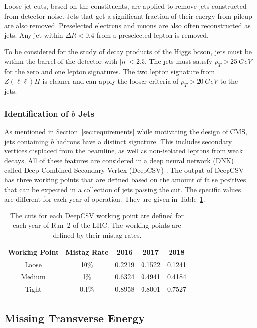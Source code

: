 Loose jet cuts, based on the constituents,
are applied to remove jets constructed from detector noise.
Jets that get a significant fraction of their energy from pileup are also removed.
Preselected electrons and muons are also often reconstructed as jets.
Any jet within $\Delta R < 0.4$ from a preselected lepton is removed.

To be considered for the study of decay products of the Higgs boson,
jets must be within the barrel of the detector with $|\eta| < 2.5$.
The jets must satisfy $p_T > \SI{25}{GeV}$ for the zero and one lepton signatures.
The two lepton signature from $Z(\ell\ell)H$ is cleaner and can apply the looser
criteria of $p_T > \SI{20}{GeV}$ to the jets.

\subsubsection{Identification of $b$ Jets}

As mentioned in Section~\ref{sec:requirements} while motivating the design of CMS,
jets containing $b$ hadrons have a distinct signature.
This includes secondary vertices displaced from the beamline,
as well as non-isolated leptons from weak decays.
All of these features are considered in a deep neural network (DNN)
called Deep Combined Secondary Vertex (DeepCSV) \cite{Sirunyan_2018}.
The output of DeepCSV has three working points
that are defined based on the amount of false positives that can be expected
in a collection of jets passing the cut.
The specific values are different for each year of operation.
They are given in Table~\ref{tab:deepcsv}.
\begin{table}
  \centering
  \caption[DeepCSV working points]{
    The cuts for each DeepCSV working point are defined for each year of Run~2 of the LHC.
    The working points are defined by their mistag rates.
  }
  {\renewcommand{\arraystretch}{1.5}
  \begin{tabular}{|c | c | c c c|}
    \hline
    Working Point & Mistag Rate & 2016 & 2017 & 2018 \\
    \hline
    Loose  &  10\% & 0.2219 & 0.1522 & 0.1241 \\
    Medium &   1\% & 0.6324 & 0.4941 & 0.4184 \\
    Tight  & 0.1\% & 0.8958 & 0.8001 & 0.7527 \\
    \hline
  \end{tabular}
  }
  \label{tab:deepcsv}
\end{table}

\subsection{Missing Transverse Energy}


